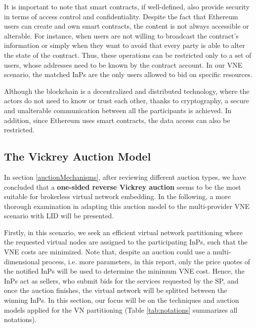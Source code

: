 It is important to note that smart contracts, if well-defined, also provide security in terms of access control and confidentiality. Despite the fact that Ethereum users can create and own smart contracts, the content is not always accessible or alterable. For instance, when users are not willing to broadcast the contract's information or simply when they want to avoid that every party is able to alter the state of the contract. Thus, these operations can be restricted only to a set of users, whose addresses need to be known by the contract account. In our VNE scenario, the matched InPs are the only users allowed to bid on specific resources.

Although the blockchain is a decentralized and distributed technology, where the actors do not need to know or trust each other, thanks to cryptography, a secure and unalterable communication between all the participants is achieved. In addition, since Ethereum uses smart contracts, the data access can also be restricted.

\subsection{The Vickrey Auction Model} \label{vickrey}

In section \ref{auctionMechanisms}, after reviewing different auction types, we have concluded that a \textbf{one-sided reverse Vickrey auction} seems to be the most suitable for brokerless virtual network embedding. In the following, a more thorough examination in adapting this auction model to the multi-provider VNE scenario with LID will be presented.

Firstly, in this scenario, we seek an efficient virtual network partitioning where the requested virtual nodes are assigned to the participating InPs, such that the VNE costs are minimized. Note that, despite an auction could use a multi-dimensional process, i.e. more parameters, in this report, only the price quotes of the notified InPs will be used to determine the minimum VNE cost. Hence, the InPs act as sellers, who submit bids for the services requested by the SP, and once the auction finishes, the virtual network will be splitted between the winning InPs. In this section, our focus will be on the techniques and auction models applied for the VN partitioning (Table \ref{tab:notations} summarizes all notations).

